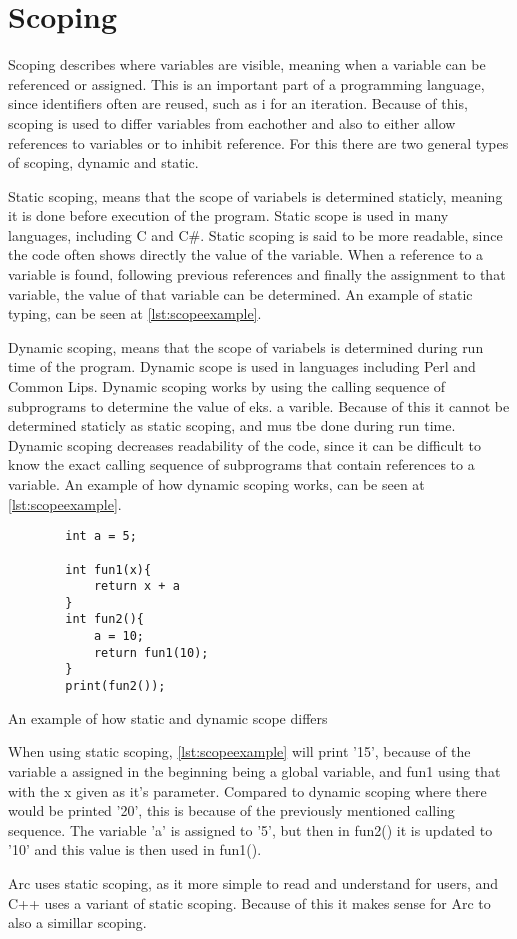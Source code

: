 \section{Scoping}
Scoping describes where variables are visible, meaning when a variable can be referenced or assigned. This is an important part of a programming language, since identifiers often are reused, such as i for an iteration. Because of this, scoping is used to differ variables from eachother and also to either allow references to variables or to inhibit reference. For this there are two general types of scoping, dynamic and static.

Static scoping, means that the scope of variabels is determined staticly, meaning it is done before execution of the program. Static scope is used in many languages, including C and C\#. Static scoping is said to be more readable, since the code often shows directly the value of the variable. When a reference to a variable is found, following previous references and finally the assignment to that variable, the value of that variable can be determined. An example of static typing, can be seen at \ref{lst:scopeexample}.

Dynamic scoping, means that the scope of variabels is determined during run time of the program. Dynamic scope is used in languages including Perl and Common Lips. Dynamic scoping works by using the calling sequence of subprograms to determine the value of eks. a varible. Because of this it cannot be determined staticly as static scoping, and mus tbe done during run time. Dynamic scoping decreases readability of the code, since it can be difficult to know the exact calling sequence of subprograms that contain references to a variable\cite{Sebesta2016}. An example of how dynamic scoping works, can be seen at \ref{lst:scopeexample}. 

\begin{listing}[htb!]
    \begin{verbatim}
        int a = 5;

        int fun1(x){
            return x + a
        }
        int fun2(){
            a = 10;
            return fun1(10);
        }
        print(fun2());
    \end{verbatim}
    \caption{An example of how static and dynamic scope differs}
    \label{lst:scopeexample}
\end{listing}

When using static scoping, \ref{lst:scopeexample} will print '15', because of the variable a assigned in the beginning being a global variable, and fun1 using that with the x given as it's parameter. Compared to dynamic scoping where there would be printed '20', this is because of the previously mentioned calling sequence. The variable 'a' is assigned to '5', but then in fun2() it is updated to '10' and this value is then used in fun1().

Arc uses static scoping, as it more simple to read and understand for users, and C++ uses a variant of static scoping. Because of this it makes sense for Arc to also a simillar scoping.

